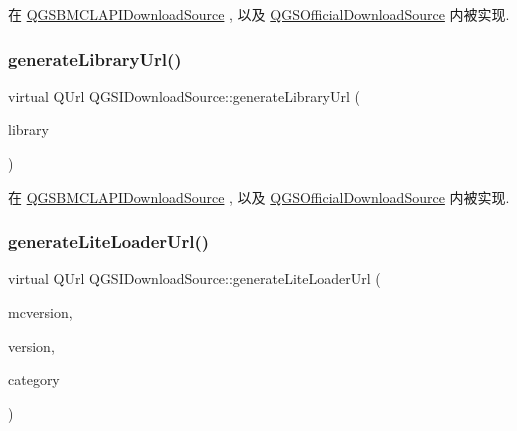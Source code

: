 在 \mbox{\hyperlink{class_q_g_s_b_m_c_l_a_p_i_download_source_a40528529f6aee100922aecf731f346bf}{Q\+G\+S\+B\+M\+C\+L\+A\+P\+I\+Download\+Source}} , 以及 \mbox{\hyperlink{class_q_g_s_official_download_source_acb74743d3cdc6c2211e56aa0e5b16b93}{Q\+G\+S\+Official\+Download\+Source}} 内被实现.

\mbox{\label{class_q_g_s_i_download_source_a8726e4ed35bb7997105de8987a621957}} 
\subsubsection{\texorpdfstring{generate\+Library\+Url()}{generateLibraryUrl()}}
{\footnotesize\ttfamily virtual Q\+Url Q\+G\+S\+I\+Download\+Source\+::generate\+Library\+Url (\begin{DoxyParamCaption}\item[{const \mbox{\hyperlink{class_q_g_s_library}{Q\+G\+S\+Library}} \&}]{library }\end{DoxyParamCaption})\hspace{0.3cm}{\ttfamily [pure virtual]}}



在 \mbox{\hyperlink{class_q_g_s_b_m_c_l_a_p_i_download_source_a04a894a9608a9730660e50cb1c80981b}{Q\+G\+S\+B\+M\+C\+L\+A\+P\+I\+Download\+Source}} , 以及 \mbox{\hyperlink{class_q_g_s_official_download_source_a07d41c6aed39acc0cdc071b374ce04bc}{Q\+G\+S\+Official\+Download\+Source}} 内被实现.

\mbox{\label{class_q_g_s_i_download_source_aed0602232cd1cbc207747c216b3b6d30}} 
\subsubsection{\texorpdfstring{generate\+Lite\+Loader\+Url()}{generateLiteLoaderUrl()}}
{\footnotesize\ttfamily virtual Q\+Url Q\+G\+S\+I\+Download\+Source\+::generate\+Lite\+Loader\+Url (\begin{DoxyParamCaption}\item[{Q\+String}]{mcversion,  }\item[{Q\+String}]{version,  }\item[{const Q\+String \&}]{category }\end{DoxyParamCaption})\hspace{0.3cm}{\ttfamily [pure virtual]}}



